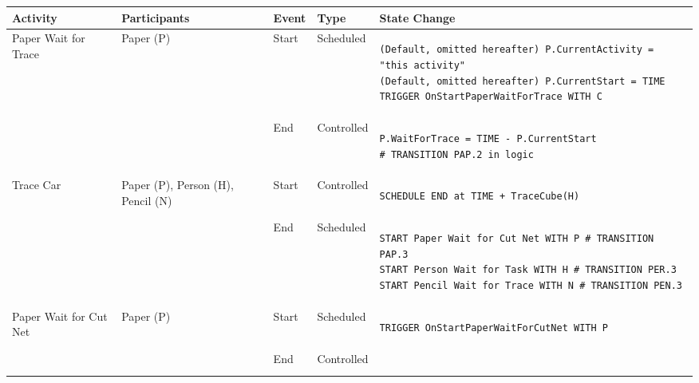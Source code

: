 \begin{longtable}{@{}>{\raggedright\arraybackslash}p{1.8cm}>{\raggedright\arraybackslash}p{2.1cm}>{\raggedright\arraybackslash}p{0.9cm}>{\raggedright\arraybackslash}p{2.2cm}>{\raggedright\arraybackslash}p{8.75cm}@{}}
  \toprule
  Activity                                   & Participants                                             & Event & Type       & State Change \\ \midrule
  \endhead
  Paper Wait for Trace      & Paper (P)                            & Start & Scheduled  & 
\begin{lstlisting}[language=CMPseudo]
(Default, omitted hereafter) P.CurrentActivity = "this activity"
(Default, omitted hereafter) P.CurrentStart = TIME
TRIGGER OnStartPaperWaitForTrace WITH C
\end{lstlisting}             \\
                                             &                                                          & End   & Controlled &
  \begin{lstlisting}[language=CMPseudo]
P.WaitForTrace = TIME - P.CurrentStart
# TRANSITION PAP.2 in logic
  \end{lstlisting}              \\ \midrule
  Trace Car                 & Paper (P), Person (H), Pencil (N)       & Start & Controlled &  
\begin{lstlisting}[language=CMPseudo]
SCHEDULE END at TIME + TraceCube(H)
\end{lstlisting}              \\
                                             &                                                          & End   & Scheduled  & 
\begin{lstlisting}[language=CMPseudo]
START Paper Wait for Cut Net WITH P # TRANSITION PAP.3
START Person Wait for Task WITH H # TRANSITION PER.3
START Pencil Wait for Trace WITH N # TRANSITION PEN.3
\end{lstlisting}              \\ \midrule
  Paper Wait for Cut Net    & Paper (P)                               & Start & Scheduled  & 
\begin{lstlisting}[language=CMPseudo]
TRIGGER OnStartPaperWaitForCutNet WITH P
\end{lstlisting}              \\
  &                                                          & End   & Controlled & 
\begin{lstlisting}[language=CMPseudo]

\end{lstlisting}
\end{longtable}
